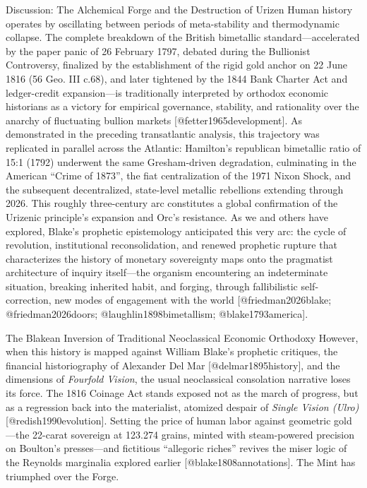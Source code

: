 \documentclass[
  ignorenonframetext,
]{beamer}
\author{\texorpdfstring{}{}}
\date{}
\begin{document}
\begin{frame}{Discussion: The Alchemical Forge and the Destruction of
Urizen}
\protect{}\label{discussion-the-alchemical-forge-and-the-destruction-of-urizen}
Human history operates by oscillating between periods of meta-stability
and thermodynamic collapse. The complete breakdown of the British
bimetallic standard---accelerated by the paper panic of 26 February
1797, debated during the Bullionist Controversy, finalized by the
establishment of the rigid gold anchor on 22 June 1816 (56 Geo. III
c.68), and later tightened by the 1844 Bank Charter Act and
ledger-credit expansion---is traditionally interpreted by orthodox
economic historians as a victory for empirical governance, stability,
and rationality over the anarchy of fluctuating bullion markets
{[}@fetter1965development{]}. As demonstrated in the preceding
transatlantic analysis, this trajectory was replicated in parallel
across the Atlantic: Hamilton's republican bimetallic ratio of 15:1
(1792) underwent the same Gresham-driven degradation, culminating in the
American ``Crime of 1873'', the fiat centralization of the 1971 Nixon
Shock, and the subsequent decentralized, state-level metallic rebellions
extending through 2026. This roughly three-century arc constitutes a
global confirmation of the Urizenic principle's expansion and Orc's
resistance. As we and others have explored, Blake's prophetic
epistemology anticipated this very arc: the cycle of revolution,
institutional reconsolidation, and renewed prophetic rupture that
characterizes the history of monetary sovereignty maps onto the
pragmatist architecture of inquiry itself---the organism encountering an
indeterminate situation, breaking inherited habit, and forging, through
fallibilistic self-correction, new modes of engagement with the world
{[}@friedman2026blake; @friedman2026doors; @laughlin1898bimetallism;
@blake1793america{]}.

\begin{block}{The Blakean Inversion of Traditional Neoclassical Economic
Orthodoxy}
\protect{}\label{the-blakean-inversion-of-traditional-neoclassical-economic-orthodoxy}
However, when this history is mapped against William Blake's prophetic
critiques, the financial historiography of Alexander Del Mar
{[}@delmar1895history{]}, and the dimensions of \emph{Fourfold Vision},
the usual neoclassical consolation narrative loses its force. The 1816
Coinage Act stands exposed not as the march of progress, but as a
regression back into the materialist, atomized despair of \emph{Single
Vision (Ulro)} {[}@redish1990evolution{]}. Setting the price of human
labor against geometric gold---the 22-carat sovereign at 123.274 grains,
minted with steam-powered precision on Boulton's presses---and
fictitious ``allegoric riches'' revives the miser logic of the Reynolds
marginalia explored earlier {[}@blake1808annotations{]}. The Mint has
triumphed over the Forge.
\end{block}


\end{frame}
\end{document}

